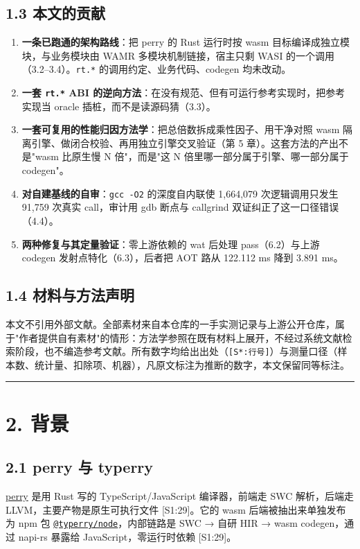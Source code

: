 \documentclass[11pt, a4paper]{article}
\begin{document}
\subsection{1.3 本文的贡献}

\begin{enumerate}
\item \textbf{一条已跑通的架构路线}：把 perry 的 Rust 运行时按 wasm 目标编译成独立模块，与业务模块由 WAMR 多模块机制链接，宿主只剩 WASI 的一个调用（3.2–3.4）。\texttt{rt.*} 的调用约定、业务代码、codegen 均未改动。
\item \textbf{一套 \texttt{rt.*} ABI 的逆向方法}：在没有规范、但有可运行参考实现时，把参考实现当 oracle 插桩，而不是读源码猜（3.3）。
\item \textbf{一套可复用的性能归因方法学}：把总倍数拆成乘性因子、用干净对照 wasm 隔离引擎、做闭合校验、再用独立引擎交叉验证（第 5 章）。这套方法的产出不是"wasm 比原生慢 N 倍"，而是"这 N 倍里哪一部分属于引擎、哪一部分属于 codegen"。
\item \textbf{对自建基线的自审}：\texttt{gcc -O2} 的深度自内联使 1,664,079 次逻辑调用只发生 91,759 次真实 call，审计用 gdb 断点与 callgrind 双证纠正了这一口径错误（4.4）。
\item \textbf{两种修复与其定量验证}：零上游依赖的 wat 后处理 pass（6.2）与上游 codegen 发射点特化（6.3），后者把 AOT 路从 122.112 ms 降到 3.891 ms。
\end{enumerate}

\subsection{1.4 材料与方法声明}

本文不引用外部文献。全部素材来自本仓库的一手实测记录与上游公开仓库，属于"作者提供自有素材"的情形：方法学参照在既有材料上展开，不经过系统文献检索阶段，也不编造参考文献。所有数字均给出出处（\texttt{[S*:行号]}）与测量口径（样本数、统计量、扣除项、机器），凡原文标注为推断的数字，本文保留同等标注。


\bigskip\hrule\bigskip

\section{2. 背景}

\subsection{2.1 perry 与 typerry}

\href{https://github.com/PerryTS/perry}{perry} 是用 Rust 写的 TypeScript/JavaScript 编译器，前端走 SWC 解析，后端走 LLVM，主要产物是原生可执行文件 [S1:29]。它的 wasm 后端被抽出来单独发布为 npm 包 \href{https://github.com/fn-a/typerry}{\texttt{@typerry/node}}，内部链路是 SWC → 自研 HIR → wasm codegen，通过 napi-rs 暴露给 JavaScript，零运行时依赖 [S1:29]。
\end{document}
